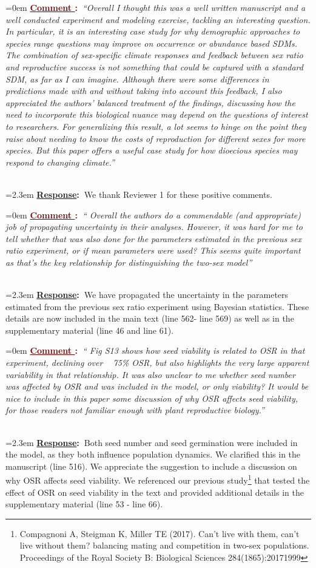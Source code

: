 \documentclass[12pt]{article}
\newcounter{cN}
\newcommand{\comment}[1]{
	\vspace{2em}
	\refstepcounter{cN} %
	\noindent \hangindent=0em \textbf{\textcolor{Maroon}{\uline{Comment \thecN}:~}}\emph{``#1''}
	}
\newcommand{\response}[1]{
	\\[0.25em]
	\hangindent=2.3em \textbf{\textcolor{NavyBlue}{\uline{Response}:~}}#1
	}
\begin{document}
\comment{Overall I thought this was a well written manuscript and a well conducted experiment and modeling exercise, tackling an interesting question. In particular, it is an interesting case study for why demographic approaches to species range questions may improve on occurrence or abundance based SDMs. The combination of sex-specific climate responses and feedback between sex ratio and reproductive success is not something that could be captured with a standard SDM, as far as I can imagine. Although there were some differences in predictions made with and without taking into account this feedback, I also appreciated the authors’ balanced treatment of the findings, discussing how the need to incorporate this biological nuance may depend on the questions of interest to researchers. For generalizing this result, a lot seems to hinge on the point they raise about needing to know the costs of reproduction for different sexes for more species. But this paper offers a
useful case study for how dioecious species may respond to changing climate.}
\response{We thank Reviewer 1 for these positive comments.}

\comment{ Overall the authors do a commendable (and appropriate) job of propagating uncertainty in their analyses. However, it was hard for me to tell whether that was also done for the parameters estimated in the previous sex ratio experiment, or if mean parameters were used? This seems quite important as that’s the key
relationship for distinguishing the two-sex model}
\response{We have propagated the uncertainty in the parameters estimated from the previous sex ratio experiment using Bayesian statistics. 
These details are now included in the main text (line 562- line 569) as well as in the supplementary material (line 46 and line 61).}

\comment{ Fig S13 shows how seed viability is related to OSR in that experiment, declining over ~ 75\% OSR, but also highlights
the very large apparent variability in that relationship. It was also unclear to me whether seed number was affected by OSR and was included in the model, or only
viability? It would be nice to include in this paper some discussion of why OSR affects seed viability, for those readers not familiar enough with plant reproductive
biology.}
\response{Both seed number and seed germination were included in the model, as they both influence population dynamics. 
We clarified this in the manuscript (line  516).
We appreciate the suggestion to include a discussion on why OSR affects seed viability.
We referenced our previous study\footnote{Compagnoni A, Steigman K, Miller TE (2017). Can’t live with them, can’t live without them? balancing mating and competition in two-sex populations. Proceedings of the Royal Society B: Biological Sciences 284(1865):20171999} that tested the effect of OSR on seed viability in the text and provided additional details in the supplementary material (line 53 - line 66).}
\end{document}
